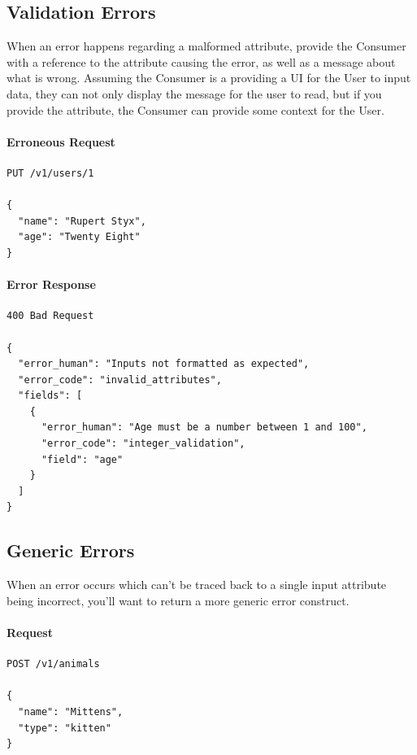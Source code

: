 \documentclass{book}
\begin{document}
\subsection{Validation Errors}

When an error happens regarding a malformed attribute, provide the Consumer with a reference to the attribute causing the error, as well as a message about what is wrong. Assuming the Consumer is a providing a UI for the User to input data, they can not only display the message for the user to read, but if you provide the attribute, the Consumer can provide some context for the User.

\paragraph{\textbf{Erroneous Request}}

\begin{verbatim}
PUT /v1/users/1

{
  "name": "Rupert Styx",
  "age": "Twenty Eight"
}
\end{verbatim}

\paragraph{\textbf{Error Response}}

\begin{verbatim}
400 Bad Request

{
  "error_human": "Inputs not formatted as expected",
  "error_code": "invalid_attributes",
  "fields": [
    {
      "error_human": "Age must be a number between 1 and 100",
      "error_code": "integer_validation",
      "field": "age"
    }
  ]
}
\end{verbatim}

\subsection{Generic Errors}

When an error occurs which can't be traced back to a single input attribute being incorrect, you'll want to return a more generic error construct.

\paragraph{\textbf{Request}}

\begin{verbatim}
POST /v1/animals

{
  "name": "Mittens",
  "type": "kitten"
}
\end{verbatim}
\end{document}
